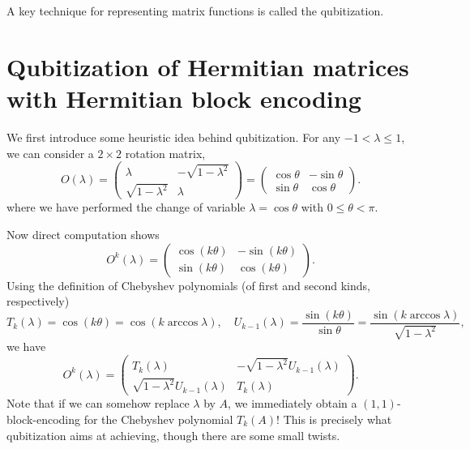 A key technique for representing matrix functions is called the qubitization.

\section{Qubitization of Hermitian matrices with Hermitian block encoding}\label{sec:qubitize_hermbe}

We first introduce some heuristic idea behind qubitization. 
For any $-1< \lambda\le 1$, we can consider a $2\times 2$ rotation matrix, \begin{equation}
O(\lambda)=\begin{pmatrix}
\lambda & -\sqrt{1-\lambda^2}\\
\sqrt{1-\lambda^2} & \lambda
\end{pmatrix}
=\begin{pmatrix}
\cos\theta & -\sin\theta\\
\sin\theta & \cos\theta
\end{pmatrix}.
\label{eqn:rotation_matrix}
\end{equation}
where we have performed the change of variable $\lambda=\cos\theta$ with $0\le \theta<\pi$.

Now direct computation shows
\begin{equation}
O^k(\lambda)=\begin{pmatrix}
\cos(k\theta) & -\sin(k\theta)\\
\sin(k\theta) & \cos(k\theta)
\end{pmatrix}.
\end{equation}
Using the definition of Chebyshev polynomials (of first and second kinds, respectively)
\begin{equation}
T_k(\lambda)=\cos(k\theta)=\cos(k\arccos \lambda), \quad U_{k-1}(\lambda)=\frac{\sin(k\theta)}{\sin\theta}=
\frac{\sin(k \arccos \lambda)}{\sqrt{1-\lambda^2}},
\end{equation}
we have
\begin{equation}
O^k(\lambda)=\begin{pmatrix}
T_k(\lambda) & -\sqrt{1-\lambda^2}U_{k-1}(\lambda)\\
\sqrt{1-\lambda^2}U_{k-1}(\lambda) & T_k(\lambda)
\end{pmatrix}.
\end{equation}
Note that if we can somehow replace $\lambda$ by $A$, we immediately obtain a $(1,1)$-block-encoding for the Chebyshev polynomial $T_k(A)$! 
This is precisely what qubitization aims at achieving, though there are some small twists.

